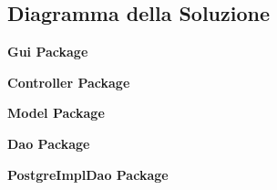 \newpage
\subsection{Diagramma della Soluzione}

\begin{figure}[h]
	
\end{figure}

\newpage

\begin{center}
	\textbf{Gui Package}
\end{center}


\begin{figure}[h]
	
\end{figure}


\newpage

\begin{center}
	\textbf{Controller Package}
\end{center}

\begin{figure}[h]
	
\end{figure}


\newpage

\begin{center}
	\textbf{Model Package}
\end{center}

\begin{figure}[h]
	
\end{figure}

\newpage

\begin{center}
	\textbf{Dao Package}
\end{center}

\begin{figure}[h]
	
\end{figure}

\newpage

\begin{center}
	\textbf{PostgreImplDao Package}
\end{center}

\begin{figure}[h]
	
\end{figure}

